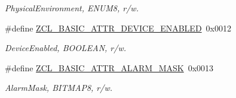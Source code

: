 \begin{DoxyCompactItemize}
\begin{DoxyCompactList}\small\item\em Physical\-Environment, E\-N\-U\-M8, r/w. \end{DoxyCompactList}\item 
\hypertarget{group__zcl__basic_gaf47c5e3169d58b3a323a7235636e1896}{\#define \hyperlink{group__zcl__basic_gaf47c5e3169d58b3a323a7235636e1896}{Z\-C\-L\-\_\-\-B\-A\-S\-I\-C\-\_\-\-A\-T\-T\-R\-\_\-\-D\-E\-V\-I\-C\-E\-\_\-\-E\-N\-A\-B\-L\-E\-D}~0x0012}\label{group__zcl__basic_gaf47c5e3169d58b3a323a7235636e1896}

\begin{DoxyCompactList}\small\item\em Device\-Enabled, B\-O\-O\-L\-E\-A\-N, r/w. \end{DoxyCompactList}\item 
\hypertarget{group__zcl__basic_gac9970c5f20b4fd743af8c71653e2d78a}{\#define \hyperlink{group__zcl__basic_gac9970c5f20b4fd743af8c71653e2d78a}{Z\-C\-L\-\_\-\-B\-A\-S\-I\-C\-\_\-\-A\-T\-T\-R\-\_\-\-A\-L\-A\-R\-M\-\_\-\-M\-A\-S\-K}~0x0013}\label{group__zcl__basic_gac9970c5f20b4fd743af8c71653e2d78a}

\begin{DoxyCompactList}\small\item\em Alarm\-Mask, B\-I\-T\-M\-A\-P8, r/w. \end{DoxyCompactList}\end{DoxyCompactItemize}
\label{_amgrp01747264fe7bf50731df0522c351974e}%

